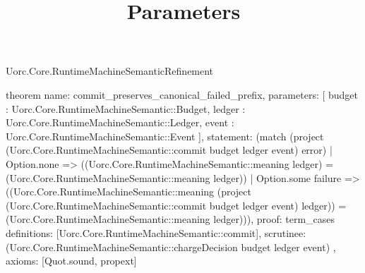 \begin{lexlean}{Uorc.Core.RuntimeMachineSemanticRefinement}
\title{Parameters}
\begin{semanticmodule}
theorem{
  name: commit_preserves_canonical_failed_prefix,
  parameters: [
    budget : Uorc.Core.RuntimeMachineSemantic::Budget,
    ledger : Uorc.Core.RuntimeMachineSemantic::Ledger,
    event : Uorc.Core.RuntimeMachineSemantic::Event
  ],
  statement: (match (project (Uorc.Core.RuntimeMachineSemantic::commit budget ledger event) error)
    | Option.none => ((Uorc.Core.RuntimeMachineSemantic::meaning ledger) = (Uorc.Core.RuntimeMachineSemantic::meaning ledger))
    | Option.some failure => ((Uorc.Core.RuntimeMachineSemantic::meaning (project (Uorc.Core.RuntimeMachineSemantic::commit budget ledger event) ledger)) = (Uorc.Core.RuntimeMachineSemantic::meaning ledger))),
  proof: term_cases{
    definitions: [Uorc.Core.RuntimeMachineSemantic::commit],
    scrutinee: (Uorc.Core.RuntimeMachineSemantic::chargeDecision budget ledger event)
  },
  axioms: [Quot.sound, propext]
}
\end{semanticmodule}
\end{lexlean}
